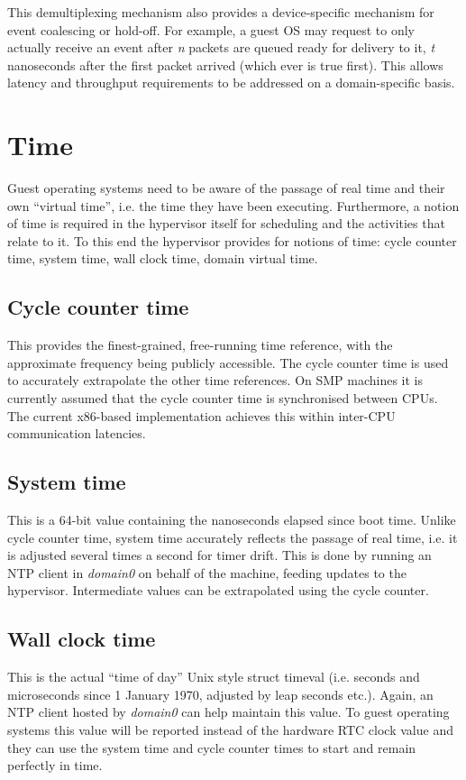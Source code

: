\documentclass[11pt,twoside,final,openright]{xenstyle}
\begin{document}
This demultiplexing mechanism also provides a device-specific mechanism for 
event coalescing or hold-off. For example, a guest OS may request to only 
actually receive an event after {\it n} packets are queued ready for delivery
to it, {\it t} nanoseconds after the first packet arrived (which ever is true
first). This allows latency and throughput requirements to be addressed on a
domain-specific basis.

\chapter{Time}
Guest operating systems need to be aware of the passage of real time and their
own ``virtual time'', i.e. the time they have been executing. Furthermore, a
notion of time is required in the hypervisor itself for scheduling and the
activities that relate to it. To this end the hypervisor provides for notions
of time: cycle counter time, system time, wall clock time, domain virtual 
time.


\section{Cycle counter time}
This provides the finest-grained, free-running time reference, with the
approximate frequency being publicly accessible. The cycle counter time is
used to accurately extrapolate the other time references. On SMP machines
it is currently assumed that the cycle counter time is synchronised between
CPUs. The current x86-based implementation achieves this within inter-CPU
communication latencies.

\section{System time}
This is a 64-bit value containing the nanoseconds elapsed since boot
time. Unlike cycle counter time, system time accurately reflects the
passage of real time, i.e.  it is adjusted several times a second for timer
drift. This is done by running an NTP client in {\it domain0} on behalf of
the machine, feeding updates to the hypervisor. Intermediate values can be
extrapolated using the cycle counter.

\section{Wall clock time}
This is the actual ``time of day'' Unix style struct timeval (i.e. seconds and
microseconds since 1 January 1970, adjusted by leap seconds etc.). Again, an 
NTP client hosted by {\it domain0} can help maintain this value. To guest 
operating systems this value will be reported instead of the hardware RTC
clock value and they can use the system time and cycle counter times to start
and remain perfectly in time.
\end{document}
